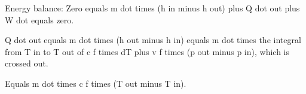 Energy balance:  
Zero equals m dot times (h in minus h out) plus Q dot out plus W dot equals zero.  

Q dot out equals m dot times (h out minus h in) equals m dot times the integral from T in to T out of c f times dT plus v f times (p out minus p in), which is crossed out.  

Equals m dot times c f times (T out minus T in).